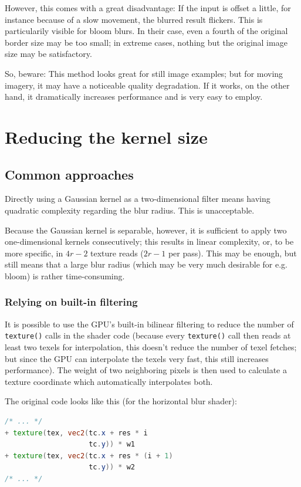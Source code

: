 \documentclass[english,fleqn,10pt,twocolumn]{article}
\begin{document}
However, this comes with a great disadvantage: If the input is offset a little, for instance because of a slow movement, the blurred result flickers. This is particularily visible for bloom blurs. In
their case, even a fourth of the original border size may be too small; in extreme cases, nothing but the original image size may be satisfactory.

So, beware: This method looks great for still image examples; but for moving imagery, it may have a noticeable quality degradation. If it works, on the other hand, it dramatically increases
performance and is very easy to employ.


\section{Reducing the kernel size}

\subsection{Common approaches}

Directly using a Gaussian kernel as a two-dimensional filter means having quadratic complexity regarding the blur radius. This is unacceptable.

Because the Gaussian kernel is separable, however, it is sufficient to apply two one-dimensional kernels consecutively; this results in linear complexity, or, to be more specific, in $4r - 2$ texture
reads ($2r - 1$ per pass). This may be enough, but still means that a large blur radius (which may be very much desirable for e.g. bloom) is rather time-consuming.

\subsubsection{Relying on built-in filtering}

It is possible to use the GPU's built-in bilinear filtering to reduce the number of {\tt texture()} calls in the shader code (because every {\tt texture()} call then reads at least two texels for
interpolation, this doesn't reduce the number of texel fetches; but since the GPU can interpolate the texels very fast, this still increases performance). The weight of two neighboring pixels is then
used to calculate a texture coordinate which automatically interpolates both.

The original code looks like this (for the horizontal blur shader):
\begin{lstlisting}[language=GLSL]
/* ... */
+ texture(tex, vec2(tc.x + res * i
                    tc.y)) * w1
+ texture(tex, vec2(tc.x + res * (i + 1)
                    tc.y)) * w2
/* ... */
\end{lstlisting}
\end{document}
